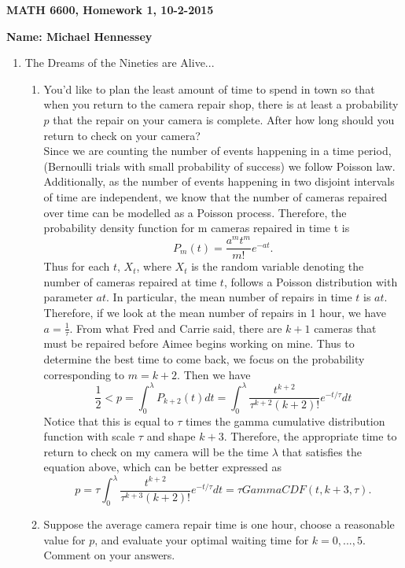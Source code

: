 \documentclass[12pt]{article}
\numberwithin{equation}{section}
\begin{document}
{\large\bf MATH 6600, Homework 1, 10-2-2015}

\vspace{6 ex}

{\bf Name: Michael Hennessey} \hfill

\vspace{6 ex}

\begin{enumerate}
\item The Dreams of the Nineties are Alive...
      \begin{enumerate}
      \item You'd like to plan the least amount of time to spend in town so that when you return to the camera repair shop, there is at least a probability $p$ that the repair on your camera is complete.  After how long should you return to check on your camera?\\

Since we are counting the number of events happening in a time period, (Bernoulli trials with small probability of success) we follow Poisson law. Additionally, as the number of events happening in two disjoint intervals of time are independent, we know that the number of cameras repaired over time can be modelled as a Poisson process. Therefore, the probability density function for  m cameras repaired in time t is 
$$P_m(t)=\frac{a^mt^m}{m!}e^{-at}.$$
Thus for each $t$, $X_t$, where $X_t$ is the random variable denoting the number of cameras repaired at time $t$, follows a Poisson distribution with parameter $at$. In particular, the mean number of repairs in time $t$ is $at$. Therefore, if we look at the mean number of repairs in 1 hour, we have $a=\frac{1}{\tau}$. From what Fred and Carrie said, there are $k+1$ cameras that must be repaired before Aimee begins working on mine. Thus to determine the best time to come back, we focus on the probability corresponding to $m=k+2$. Then we have
$$\frac{1}{2}<p=\int_0^\lambda P_{k+2}(t)dt=\int_0^\lambda\frac{t^{k+2}}{\tau^{k+2}(k+2)!}e^{-t/\tau}dt$$
Notice that this is equal to $\tau $ times the gamma cumulative distribution function with scale $\tau $ and shape $k+3$. Therefore, the appropriate time to return to check on my camera will be the time $\lambda$ that satisfies the equation above, which can be better expressed as
$$p=\tau\int_0^\lambda\frac{t^{k+2}}{\tau^{k+3}(k+2)!}e^{-t/\tau}dt=\tau GammaCDF(t,k+3,\tau).$$

\item Suppose the average camera repair time is one hour, choose a reasonable value for $p$, and evaluate your optimal waiting time for $k=0,...,5$. Comment on your answers.


\end{enumerate}
\end{enumerate}
\end{document}
